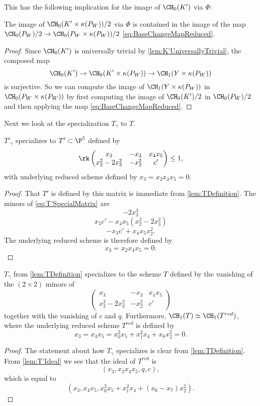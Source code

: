 This has the following implication for the image of $\CH_0(K')$ via $\Phi$:
\begin{lemma}
\label{lem:PWBaseChange1}
  The image of $\CH_0(K' \times \kappa(P_W))/2$ via $\Phi$ is contained in the image of the map $\CH_0(P_W)/2 \to \CH_0(P_W \times \kappa(P_W))/2$ \eqref{eq:BaseChangeMapReduced}.
\end{lemma}
\begin{proof}
Since $\CH_0(K')$ is universally trivial by \cref{lem:K'UniversallyTrivial}, the composed map
\[\CH_0(K') \to \CH_0(K' \times \kappa(P_W)) \to \CH_1(Y \times \kappa(P_W))\]
is surjective. So we can compute the image of $\CH_1(Y \times \kappa(P_W))$ in $\CH_0(P_W \times \kappa(P_W))$ by first computing the image of $\CH_0(K')/2$ in $\CH_0(P_W)/2$ and then applying the map \eqref{eq:BaseChangeMapReduced}.
\end{proof}

Next we look at the specialization $T_\gamma$ to $T$.
\begin{lemma}
\label{lem:T'Ideal}
  $T'_\gamma$ specializes to $T' \subset \P^5$ defined by
    \begin{equation}
  	\label{eq:T'SpecialMatrix}
  	\rk
  	\begin{pmatrix}
  		x_3 & -x_3 & x_4x_5\\
  		x_2^2-2x_3^2 & -x_2^2 & c'    
  	\end{pmatrix} \leq 1,
  \end{equation}
	with underlying reduced scheme defined by $x_3 = x_2x_4x_5=0$.
\end{lemma}
\begin{proof}
	That $T'$ is defined by this matrix is immediate from \cref{lem:TDefinition}. The minors of \eqref{eq:T'SpecialMatrix} are
	  \[-2x_3^3\]
	\[x_3c' - x_4x_5 (x_2^2 - 2x_3^2)\]
	\[ -x_3 c' + x_4x_5x_2^2. \]
The underlying reduced scheme is therefore defined by
\[x_3 = x_2x_4x_5=0.\]
\end{proof}

\begin{lemma}
  \label{lem:TEquation}
  $T_\gamma$ from \cref{lem:TDefinition} specializes to the scheme $T$ defined by the vanishing of the $(2 \times 2)$ minors of
  \begin{equation}
  	\begin{pmatrix}
  		x_3 & -x_3 & x_4x_5\\
  		x_2^2-2x_3^2 & -x_2^2 & c'    
  	\end{pmatrix}
  \end{equation}
together with the vanishing of $c$ and $q$.
Furthermore, $\CH_1(T) \simeq \CH_1(T^{red})$, where the underlying reduced scheme $T^{red}$ is defined by
\[x_3 = x_4x_5 = x_0^2x_5 + x_1^2x_4 + x_6x_2^2 = 0.\]
\end{lemma}
\begin{proof}
The statement about how $T_\gamma$ specializes is clear from \cref{lem:TDefinition}. From \cref{lem:T'Ideal} we see that the ideal of $T^{red}$ is
\[\left(x_3,x_2x_4x_5,q,c \right), \]
which is equal to
\[\left(x_3,x_4x_5,x_0^2x_5 + x_1^2x_4 + (x_6-x_7)x_2^2\right). \]
\end{proof}

